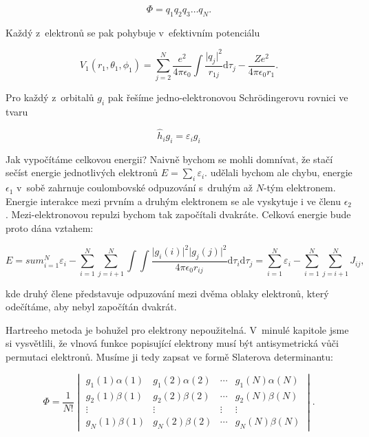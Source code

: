 \begin{equation}
\Phi = q_1 q_2 q_3 \dots q_N.
\label{rov:VE-44}
\end{equation}

\noindent Každý z~elektronů se pak pohybuje v~efektivním potenciálu

\begin{equation}
V_1 (r_1, \theta_1,\phi_1) = \sum_{j=2}^N \frac{e^2}{4 \pi \epsilon_0} \int \frac{\vert q_j \vert^2}{r_{1j}} \mathrm{d}\tau_j - \frac{Z e^2}{4 \pi \epsilon_0 r_1}.
\label{rov:VE-45}
\end{equation}

\noindent Pro každý z~orbitalů $g_i$ pak řešíme jedno-elektronovou Schr\"odingerovu rovnici ve tvaru

\begin{equation}
\hat{h}_i g_i = \varepsilon_i g_i
\label{rov:VE-46}
\end{equation}

Jak vypočítáme celkovou energii? Naivně bychom se mohli domnívat, že stačí sečíst energie jednotlivých elektronů $E = \sum_i \varepsilon_i$. udělali bychom ale chybu, energie $\epsilon_1$ v~sobě zahrnuje coulombovské odpuzování s~druhým až $N$-tým elektronem. Energie interakce mezi prvním a druhým elektronem se ale vyskytuje i ve členu $\epsilon_2$. Mezi-elektronovou repulzi bychom tak započítali dvakráte. Celková energie bude proto dána vztahem:

\begin{equation}
E = sum_{i=1}^N \varepsilon_i - \sum_{i=1}^N \sum_{j=i+1}^N \int \int \frac{\vert g_i(i) \vert^2 \vert g_j(j)\vert^2}{4 \pi \epsilon_0 r_{ij}} \mathrm{d}\tau_i \mathrm{d}\tau_j = \sum_{i=1}^N \varepsilon_i - \sum_{i=1}^N \sum_{j=i+1}^N J_{ij},
\label{rov:VE-47}
\end{equation}

\noindent kde druhý člene představuje odpuzování mezi dvěma oblaky elektronů, který odečítáme, aby nebyl započítán dvakrát.


Hartreeho metoda je bohužel pro elektrony nepoužitelná. V~minulé kapitole jsme si vysvětlili, že vlnová funkce popisující elektrony musí být antisymetrická vůči permutaci elektronů. Musíme ji tedy zapsat ve formě Slaterova determinantu:

\begin{equation}
\Phi = \frac{1}{N!}
\begin{vmatrix}
g_1(1) \alpha (1) & g_1(2) \alpha (2) & \cdots & g_1(N) \alpha (N) \\
g_2(1) \beta (1) & g_2(2) \beta (2) & \cdots & g_2(N) \beta (N) \\
\vdots & \vdots & \vdots & \vdots \\
g_N(1) \beta (1) & g_N(2) \beta (2) & \cdots &g_N(N) \beta (N)
\end{vmatrix}.
\label{rov:VE-48}
\end{equation}


